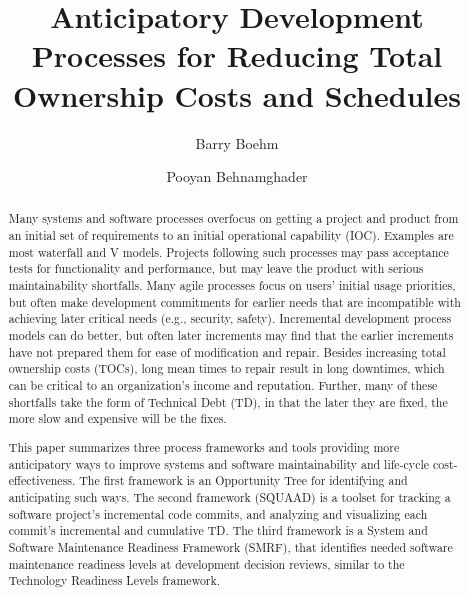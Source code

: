 \documentclass[alpha-refs]{wiley-article}
\title{Anticipatory Development Processes for Reducing Total Ownership Costs and Schedules}
\author[1]{Barry Boehm}
\author[1]{Pooyan Behnamghader}
\affil[1]{Computer Science Deparment, University of Southern California, Los Angeles, California, 90007, USA}
\begin{document}
\maketitle

\begin{abstract}
Many systems and software processes overfocus on getting a project and product from an initial set of requirements to an initial operational capability (IOC).  Examples are most waterfall and V models.  Projects following such processes may pass acceptance tests for functionality and performance, but may leave the product with serious maintainability shortfalls.  Many agile processes focus on users' initial usage priorities, but often make development commitments for earlier needs that are incompatible with achieving later critical needs (e.g., security, safety).  Incremental development process models can do better, but often later increments may find that the earlier increments have not prepared them for ease of modification and repair.  Besides increasing total ownership costs (TOCs), long mean times to repair result in long downtimes, which can be critical to an organization's income and reputation.  Further, many of these shortfalls take the form of Technical Debt (TD), in that the later they are fixed, the more
slow and 
expensive will be the fixes. 

This paper summarizes three process frameworks and tools providing more anticipatory ways to improve systems and software maintainability and life-cycle cost-effectiveness.  The first framework is an Opportunity Tree for identifying and anticipating such ways. 
The second framework (SQUAAD) is a toolset for tracking a software project's incremental code commits, and analyzing and visualizing each commit's incremental and cumulative TD.
The third framework is a System and Software Maintenance Readiness Framework (SMRF), that identifies needed software maintenance readiness levels at development decision reviews, similar to the Technology Readiness Levels framework.


\end{abstract}
\end{document}
